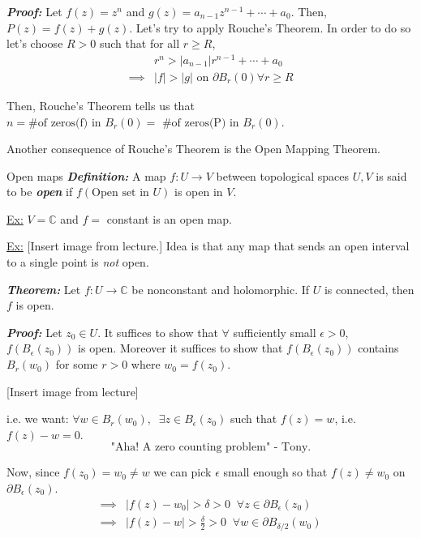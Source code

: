 \documentclass{article}
\newcommand{\C}{\mathbb{C}}
\begin{document}
\emph{\textbf{Proof:}}
Let $f(z) = z^n$ and $g(z) = a_{n-1} z^{n-1} + \cdots + a_0$. Then, $P(z) = f(z) + g(z)$. Let's try to apply Rouche's Theorem. In order to do so let's choose $R > 0$ such that for all $r \geq R$, 
\begin{align*}
  & r^n > |a_{n-1}| r^{n-1} + \cdots + a_0 \\
  \implies & |f| > |g| \text{ on } \partial B_r(0) \forall r \geq R
\end{align*}

Then, Rouche's Theorem tells us that $n = \text{\# of zeros(f) in } B_r(0) = \text{ \# of zeros(P) in } B_r(0)$.

\vskip 0.5cm
Another consequence of Rouche's Theorem is the Open Mapping Theorem.

\begin{mathdefinitionbox}{Open maps}
\vskip 0.25cm
  \emph{\textbf{Definition:}} A map $f : U \rightarrow V$ between topological spaces $U, V$ is said to be \emph{\textbf{open}} if $f(\text{Open set in }U)$ is open in $V$.
\end{mathdefinitionbox}

\vskip 0.5cm
\underline{Ex:} $V = \C$ and $f = $ constant is an open map. 

\underline{Ex:} [Insert image from lecture.] Idea is that any map that sends an open interval to a single point is \emph{not} open.

\vskip 0.5cm
\begin{dottedbox}
  \emph{\textbf{Theorem:}} Let $f : U \rightarrow \C$ be nonconstant and holomorphic. If $U$ is connected, then $f$ is open.
\end{dottedbox}

\emph{\textbf{Proof:}} Let $z_0 \in U$. It suffices to show that $\forall$ sufficiently small $\epsilon > 0$, $f\left(B_{\epsilon}(z_0)\right)$ is open. Moreover it suffices to show that $f\left(B_{\epsilon}(z_0)\right)$ contains $B_r(w_0)$ for some $r > 0$ where $w_0 = f(z_0)$.

\vskip 0.5cm
[Insert image from lecture]

\vskip 0.5cm
i.e. we want: $\forall w \in B_r(w_0), \;\;\exists z \in B_{\epsilon}(z_0)$ such that $f(z) = w$, i.e. $f(z) - w = 0$. 
\[ \text{"Aha! A zero counting problem" - Tony.} \]

Now, since $f(z_0) = w_0 \neq w$ we can pick $\epsilon$ small enough so that $f(z) \neq w_0$ on $\partial B_{\epsilon} (z_0)$.
\begin{align*}
  \implies& |f(z) - w_0| > \delta > 0\;\;\forall z \in \partial B_{\epsilon}(z_0) \\
  \implies& |f(z) - w| > \frac{\delta}{2} > 0\;\;\forall w \in \partial B_{\delta/2}(w_0)
\end{align*}
\end{document}
